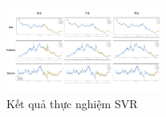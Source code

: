 \begin{figure}[H]
\centerline{\includegraphics[width=0.45\textwidth]{img/SVR_result.png}}
\caption{Kết quả thực nghiệm SVR}
\label{fig}
\end{figure}